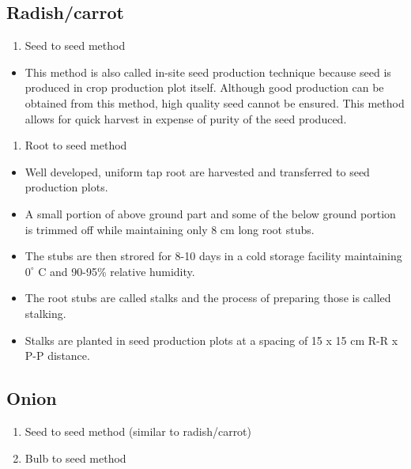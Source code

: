 \documentclass[
  openany]{book}
\providecommand{\tightlist}{%
  \setlength{\itemsep}{0pt}\setlength{\parskip}{0pt}}
\begin{document}
\hypertarget{radishcarrot}{%
\subsection{Radish/carrot}\label{radishcarrot}}

\begin{enumerate}
\def\labelenumi{\arabic{enumi}.}
\tightlist
\item
  Seed to seed method
\end{enumerate}

\begin{itemize}
\tightlist
\item
  This method is also called in-site seed production technique because seed is produced in crop production plot itself. Although good production can be obtained from this method, high quality seed cannot be ensured. This method allows for quick harvest in expense of purity of the seed produced.
\end{itemize}

\begin{enumerate}
\def\labelenumi{\arabic{enumi}.}
\setcounter{enumi}{1}
\tightlist
\item
  Root to seed method
\end{enumerate}

\begin{itemize}
\tightlist
\item
  Well developed, uniform tap root are harvested and transferred to seed production plots.
\item
  A small portion of above ground part and some of the below ground portion is trimmed off while maintaining only 8 cm long root stubs.
\item
  The stubs are then strored for 8-10 days in a cold storage facility maintaining \(0^\circ\) C and 90-95\% relative humidity.
\item
  The root stubs are called stalks and the process of preparing those is called stalking.
\item
  Stalks are planted in seed production plots at a spacing of 15 x 15 cm R-R x P-P distance.
\end{itemize}

\hypertarget{onion}{%
\subsection{Onion}\label{onion}}

\begin{enumerate}
\def\labelenumi{\arabic{enumi}.}
\tightlist
\item
  Seed to seed method (similar to radish/carrot)
\item
  Bulb to seed method
\end{enumerate}
\end{document}
